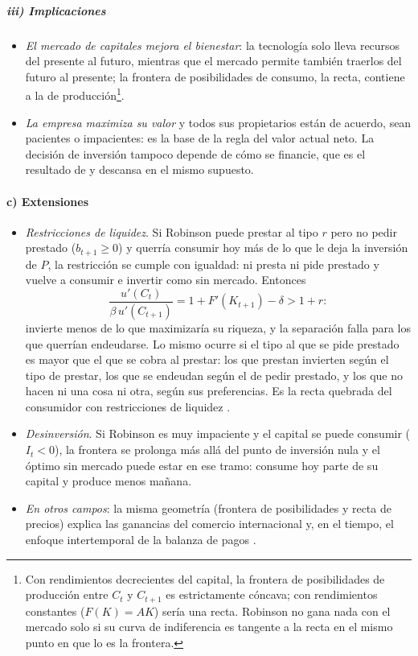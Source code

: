 \documentclass[11pt]{article}
\begin{document}
\subparagraph{iii) Implicaciones}

\begin{itemize}
\item \emph{El mercado de capitales mejora el bienestar}: la tecnología solo lleva recursos del presente al futuro, mientras que el mercado permite también traerlos del futuro al presente; la frontera de posibilidades de consumo, la recta, contiene a la de producción\footnote{Con rendimientos decrecientes del capital, la frontera de posibilidades de producción entre $C_t$ y $C_{t+1}$ es estrictamente cóncava; con rendimientos constantes ($F(K)=AK$) sería una recta. Robinson no gana nada con el mercado solo si su curva de indiferencia es tangente a la recta en el mismo punto en que lo es la frontera.}.
\item \emph{La empresa maximiza su valor} y todos sus propietarios están de acuerdo, sean pacientes o impacientes: es la base de la regla del valor actual neto. La decisión de inversión tampoco depende de cómo se financie, que es el resultado de \textcite{ModiglianiMiller1958Cost} y descansa en el mismo supuesto.
\end{itemize}

\paragraph{c) Extensiones}

\begin{itemize}
\item \emph{Restricciones de liquidez}. Si Robinson puede prestar al tipo $r$ pero no pedir prestado ($b_{t+1}\geq0$) y querría consumir hoy más de lo que le deja la inversión de $P$, la restricción se cumple con igualdad: ni presta ni pide prestado y vuelve a consumir e invertir como sin mercado. Entonces
  \begin{equation*}
  \frac{u'(C_t)}{\beta\,u'(C_{t+1})}=1+F'(K_{t+1})-\delta>1+r:
  \end{equation*}
  invierte menos de lo que maximizaría su riqueza, y la separación falla para los que querrían endeudarse. Lo mismo ocurre si el tipo al que se pide prestado es mayor que el que se cobra al prestar: los que prestan invierten según el tipo de prestar, los que se endeudan según el de pedir prestado, y los que no hacen ni una cosa ni otra, según sus preferencias\nocite{Hirshleifer1958Optimal}. Es la recta quebrada del consumidor con restricciones de liquidez .
\item \emph{Desinversión}. Si Robinson es muy impaciente y el capital se puede consumir ($I_t<0$), la frontera se prolonga más allá del punto de inversión nula y el óptimo sin mercado puede estar en ese tramo: consume hoy parte de su capital y produce menos mañana.
\item \emph{En otros campos}: la misma geometría (frontera de posibilidades y recta de precios) explica las ganancias del comercio internacional\nocite{Haberler1936Theory}  y, en el tiempo, el enfoque intertemporal de la balanza de pagos\nocite{ObstfeldRogoff1995Intertemporal} .
\end{itemize}
\end{document}
